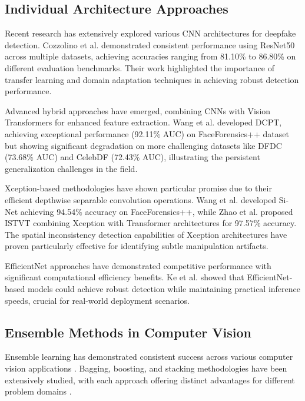 \documentclass[conference]{IEEEtran}
\begin{document}
\subsection{Individual Architecture Approaches}

Recent research has extensively explored various CNN architectures for deepfake detection. Cozzolino et al. \cite{cozzolino2023} demonstrated consistent performance using ResNet50 across multiple datasets, achieving accuracies ranging from 81.10\% to 86.80\% on different evaluation benchmarks. Their work highlighted the importance of transfer learning and domain adaptation techniques in achieving robust detection performance.

Advanced hybrid approaches have emerged, combining CNNs with Vision Transformers for enhanced feature extraction. Wang et al. \cite{wang2023deep} developed DCPT, achieving exceptional performance (92.11\% AUC) on FaceForensics++ dataset but showing significant degradation on more challenging datasets like DFDC (73.68\% AUC) and CelebDF (72.43\% AUC), illustrating the persistent generalization challenges in the field.

Xception-based methodologies have shown particular promise due to their efficient depthwise separable convolution operations. Wang et al. \cite{wang2023si} developed Si-Net achieving 94.54\% accuracy on FaceForensics++, while Zhao et al. \cite{zhao2023} proposed ISTVT combining Xception with Transformer architectures for 97.57\% accuracy. The spatial inconsistency detection capabilities of Xception architectures have proven particularly effective for identifying subtle manipulation artifacts.

EfficientNet approaches have demonstrated competitive performance with significant computational efficiency benefits. Ke et al. \cite{ke2023} showed that EfficientNet-based models could achieve robust detection while maintaining practical inference speeds, crucial for real-world deployment scenarios.

\subsection{Ensemble Methods in Computer Vision}

Ensemble learning has demonstrated consistent success across various computer vision applications \cite{dietterich2000ensemble}. Bagging, boosting, and stacking methodologies have been extensively studied, with each approach offering distinct advantages for different problem domains \cite{breiman1996bagging}.
\end{document}
